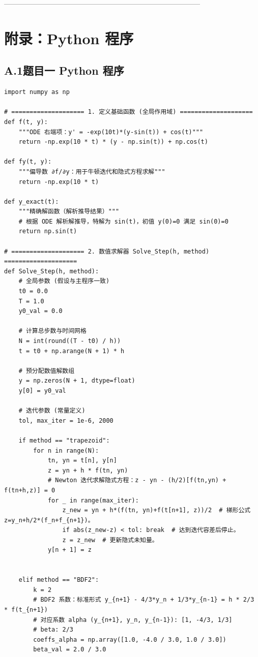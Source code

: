 \documentclass[UTF8,a4paper,11pt]{ctexart}                    %
\begin{document}
-----------------------------------------------------------------------------------
\clearpage
\section*{附录：Python 程序}

\subsection*{A.1\quad 题目一 Python 程序}

\begin{lstlisting}[style=python,caption={梯形方法、BDF2、改进Euler方法比较}]
import numpy as np

# ==================== 1. 定义基础函数 (全局作用域) ====================
def f(t, y):
    """ODE 右端项：y' = -exp(10t)*(y-sin(t)) + cos(t)"""
    return -np.exp(10 * t) * (y - np.sin(t)) + np.cos(t)

def fy(t, y):
    """偏导数 ∂f/∂y：用于牛顿迭代和隐式方程求解"""
    return -np.exp(10 * t)

def y_exact(t):
    """精确解函数（解析推导结果）"""
    # 根据 ODE 解析解推导，特解为 sin(t)，初值 y(0)=0 满足 sin(0)=0
    return np.sin(t)

# ==================== 2. 数值求解器 Solve_Step(h, method) ====================
def Solve_Step(h, method):
    # 全局参数 (假设与主程序一致)
    t0 = 0.0
    T = 1.0
    y0_val = 0.0

    # 计算总步数与时间网格
    N = int(round((T - t0) / h))
    t = t0 + np.arange(N + 1) * h

    # 预分配数值解数组
    y = np.zeros(N + 1, dtype=float)
    y[0] = y0_val

    # 迭代参数 (常量定义)
    tol, max_iter = 1e-6, 2000

    if method == "trapezoid":
        for n in range(N):
            tn, yn = t[n], y[n]
            z = yn + h * f(tn, yn)
            # Newton 迭代求解隐式方程：z - yn - (h/2)[f(tn,yn) + f(tn+h,z)] = 0
            for _ in range(max_iter):
                z_new = yn + h*(f(tn, yn)+f(t[n+1], z))/2  # 梯形公式 z=y_n+h/2*(f_n+f_{n+1})。
                if abs(z_new-z) < tol: break  # 达到迭代容差后停止。
                z = z_new  # 更新隐式未知量。
            y[n + 1] = z


    elif method == "BDF2":
        k = 2
        # BDF2 系数：标准形式 y_{n+1} - 4/3*y_n + 1/3*y_{n-1} = h * 2/3 * f(t_{n+1})
        # 对应系数 alpha (y_{n+1}, y_n, y_{n-1}): [1, -4/3, 1/3]
        # beta: 2/3
        coeffs_alpha = np.array([1.0, -4.0 / 3.0, 1.0 / 3.0])
        beta_val = 2.0 / 3.0


\end{lstlisting}
\end{document}
